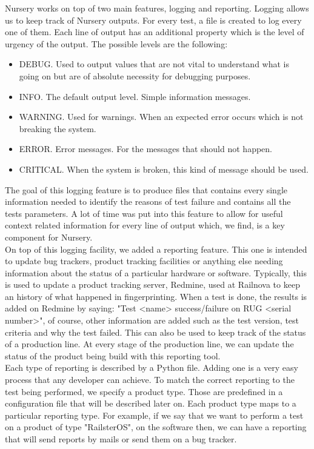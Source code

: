 \documentclass[12pt]{article}
\theoremstyle{definition}
\theoremstyle{definition}
\theoremstyle{remark}
\begin{document}
Nursery works on top of two main features, logging and reporting. Logging allows us to keep track of Nursery outputs. For every test, a file is created to log every one of them. Each line of output has an additional property which is the level of urgency of the output. The possible levels are the following:

\begin{itemize}
\item DEBUG. Used to output values that are not vital to understand what is going on but are of absolute necessity for debugging purposes.
\item INFO. The default output level. Simple information messages.
\item WARNING. Used for warnings. When an expected error occurs which is not breaking the system.
\item ERROR. Error messages. For the messages that should not happen.
\item CRITICAL. When the system is broken, this kind of message should be used.
\end{itemize}

The goal of this logging feature is to produce files that contains every single information needed to identify the reasons of test failure and contains all the tests parameters. A lot of time was put into this feature to allow for useful context related information for every line of output which, we find, is a key component for Nursery.\\

On top of this logging facility, we added a reporting feature. This one is intended to update bug trackers, product tracking facilities or anything else needing information about the status of a particular hardware or software. Typically, this is used to update a product tracking server, Redmine, used at Railnova to keep an history of what happened in fingerprinting. When a test is done, the results is added on Redmine by saying: "Test <name> success/failure on RUG <serial number>", of course, other information are added such as the test version, test criteria and why the test failed. This can also be used to keep track of the status of a production line. At every stage of the production line, we can update the status of the product being build with this reporting tool.\\

Each type of reporting is described by a Python file. Adding one is a very easy process that any developer can achieve. To match the correct reporting to the test being performed, we specify a product type. Those are predefined in a configuration file that will be described later on. Each product type maps to a particular reporting type. For example, if we say that we want to perform a test on a product of type "RailsterOS", on the software then, we can have a reporting that will send reports by mails or send them on a bug tracker.\\
\end{document}
